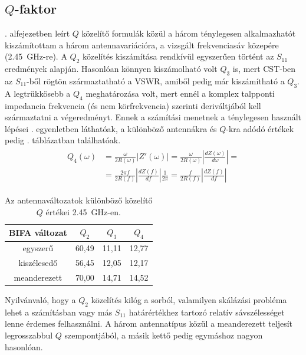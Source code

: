 \subsection{$Q$-faktor}
. alfejezetben leírt $Q$ közelítő formulák közül a három ténylegesen alkalmazhatót kiszámítottam a három antennavariációra, a vizsgált frekvenciasáv közepére (\SI{2,45}{GHz}-re). A $Q_2$ közelítés kiszámítása rendkívül egyszerűen történt az $S_{11}$ eredmények alapján. Hasonlóan könnyen kiszámolható volt $Q_3$ is, mert CST-ben az $S_{11}$-ből rögtön származtatható a VSWR, amiből pedig már kiszámítható a $Q_3$. A legtrükkösebb a $Q_4$ meghatározása volt, mert ennél a komplex talpponti impedancia frekvencia (és nem körfrekvencia) szerinti deriváltjából kell származtatni a végeredményt. Ennek a számítási menetnek a ténylegesen használt lépései . egyenletben láthatóak, a különböző antennákra és $Q$-kra adódó értékek pedig . táblázatban találhatóak.
	\begin{align}
		\begin{split}\label{equ:actual-q4}
			Q_4(\omega) & = \frac{\omega}{2 R(\omega)}|Z'(\omega)| = \frac{\omega}{2 R(\omega)}\left|\frac{d Z(\omega)}{d \omega}\right| = \\[0.5ex]
						& = \frac{2 \pi f}{2 R(f)}\left|\frac{d Z(f)}{d f}\right| \frac{1}{2 \pi} = \frac{f}{2 R(f)}\left|\frac{d Z(f)}{d f}\right|
		\end{split}
	\end{align}
\begin{table}[h!]
	\centering
	\begin{tabular}{|c|c|c|c|}
	\hline
	BIFA változat 	& $Q_2$ & $Q_3$ & $Q_4$ \\
	\hline
	egyszerű 		& 60,49 & 11,11 & 12,77 \\
	\hline
	kiszélesedő 	& 56,45 & 12,05 & 12,17 \\
	\hline
	meanderezett 	& 70,00 & 14,71 & 14,52 \\
	\hline
	\end{tabular}
	\caption{Az antennaváltozatok különböző közelítő $Q$ értékei \SI{2,45}{GHz}-en.}
	\label{tab:q}
\end{table}
Nyilvánvaló, hogy a $Q_2$ közelítés kilóg a sorból, valamilyen skálázási probléma lehet a számításban vagy más $S_{11}$ határértékhez tartozó relatív sávszélességet lenne érdemes felhasználni. A három antennatípus közül a meanderezett teljesít legrosszabbul $Q$ szempontjából, a másik kettő pedig egymáshoz nagyon hasonlóan.
